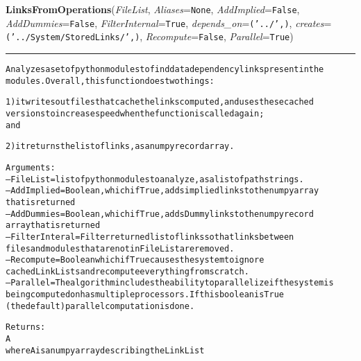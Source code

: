 \hspace{.8\funcindent}\begin{boxedminipage}{\funcwidth}

    \raggedright \textbf{LinksFromOperations}(\textit{FileList}, \textit{Aliases}={\tt None}, \textit{AddImplied}={\tt False}, \textit{AddDummies}={\tt False}, \textit{FilterInternal}={\tt True}, \textit{depends\_on}={\tt ('../',)}, \textit{creates}={\tt ('../System/StoredLinks/',)}, \textit{Recompute}={\tt False}, \textit{Parallel}={\tt True})

    \vspace{-1.5ex}

    \rule{\textwidth}{0.5\fboxrule}
\setlength{\parskip}{2ex}
\begin{alltt}

Analyzes a set of python modules to find data dependency links present in the 
modules.   Overall, this function does two things:  

1) it writes out files that cache the links computed, and uses these cached 
        versions to increase speed when the function is called again;
and

2) it returns the list of links, as a numpy record array.  
        
Arguments:
--FileList = list of python modules to analyze, as a list of path strings. 
--AddImplied = Boolean, which if True, adds implied links to the numpy array 
        that is returned 
--AddDummies = Boolean, which if True, adds Dummy links to the numpy record 
        array that is returned 
--FilterInteral = Filter returned list of links so that links between 
        files and modules that are not in FileList are removed. 
--Recompute = Boolean which if True causes the system to ignore 
        cached LinkLists and recompute everything from scratch.
--Parallel = The algorithm includes the ability to parallelize if the system is
        being computed on has multiple processors.  If this boolean is True
        (the default) parallel computation is done. 
        
Returns:
        A
where A is a numpy array describing the LinkList 
\end{alltt}

\setlength{\parskip}{1ex}
    \end{boxedminipage}

    \label{System:LinkManagement:GetImpliedLinks}


